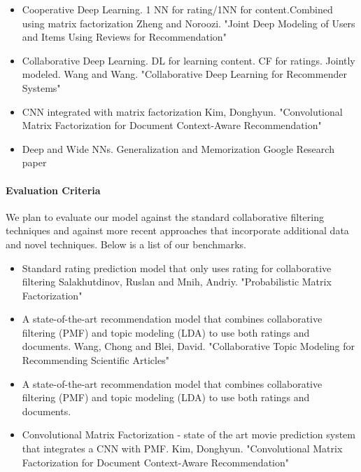 \documentclass{article}
\begin{document}
\begin{itemize}
\item Cooperative Deep Learning. 1 NN for rating/1NN for content.Combined using matrix factorization
\subitem Zheng and Noroozi. "Joint Deep Modeling of Users and Items Using Reviews for Recommendation"
\item Collaborative Deep Learning. DL for learning content. CF for ratings. Jointly modeled. 
\subitem Wang and Wang. "Collaborative Deep Learning for Recommender Systems"
\item CNN integrated with matrix factorization
\subitem Kim, Donghyun. "Convolutional Matrix Factorization for Document Context-Aware Recommendation"
\item Deep and Wide NNs. Generalization and Memorization
\subitem Google Research paper
\end{itemize}


\paragraph{Evaluation Criteria} We plan to evaluate our model against the standard collaborative filtering techniques and against more recent approaches that incorporate additional data and novel techniques. Below is a list of our benchmarks. 

\begin{itemize}
\item Standard rating prediction model that only uses rating for collaborative filtering
\subitem Salakhutdinov, Ruslan and Mnih, Andriy. "Probabilistic Matrix Factorization" 
\item A state-of-the-art recommendation model that combines collaborative filtering (PMF) and topic modeling (LDA) to use both ratings and documents.
\subitem Wang, Chong and Blei, David. "Collaborative Topic Modeling for Recommending Scientific Articles"
\item A state-of-the-art recommendation model that combines collaborative filtering (PMF) and topic modeling (LDA) to use both ratings and documents.
\item Convolutional Matrix Factorization - state of the art movie prediction system that integrates a CNN with PMF. 
\subitem Kim, Donghyun. "Convolutional Matrix Factorization for Document Context-Aware Recommendation"
\end{itemize}
\end{document}
